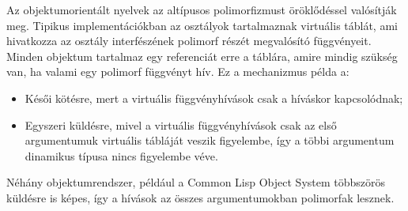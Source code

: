 \documentclass[margin=0px]{article}
\begin{document}
Az objektumorientált nyelvek az altípusos polimorfizmust öröklődéssel valósítják meg. Tipikus implementációkban az osztályok tartalmaznak virtuális táblát, ami hivatkozza az osztály interfészének polimorf részét megvalósító függvényeit. Minden objektum tartalmaz egy referenciát erre a táblára, amire mindig szükség van, ha valami egy polimorf függvényt hív. Ez a mechanizmus példa a:
\begin{itemize}
    \item Késői kötésre, mert a virtuális függvényhívások csak a híváskor kapcsolódnak;
    \item Egyszeri küldésre, mivel a virtuális függvényhívások csak az első argumentumuk virtuális tábláját veszik figyelembe, így a többi argumentum dinamikus típusa nincs figyelembe véve.
\end{itemize}

Néhány objektumrendszer, például a Common Lisp Object System többszörös küldésre is képes, így a hívások az összes argumentumokban polimorfak lesznek.
\end{document}
